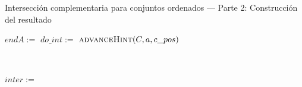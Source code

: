 \begin{algorithm}
\caption{Intersección complementaria para conjuntos ordenados — Parte 2: Construcción del resultado}
\label{alg:int-comp-2}
\begin{algorithmic}[1]
\State $endA :=$ 
        \State $do\_int :=$ 
        \State $\Call{advanceHint}{C, a, c\_pos}$
    

    \ 
    
                \State $inter :=$ 
                    \State {}
                \EndIf
            \EndIf
        
    
            \EndFor
   \
        
        \Else
            \State {}
        \EndIf
        
    \
    

    \EndFor
            
    \
    
    \State {}
\EndFunction
\end{algorithmic}
\end{algorithm}